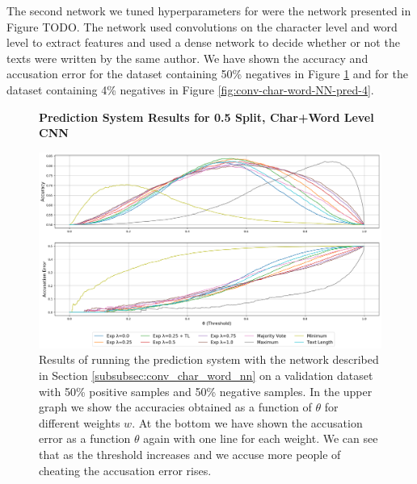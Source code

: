 The second network we tuned hyperparameters for were the network presented
in Figure TODO. The network used convolutions on the character level and
word level to extract features and used a dense network to decide whether or
not the texts were written by the same author. We have shown the accuracy
and accusation error for the dataset containing 50\% negatives in Figure
\ref{fig:conv-char-word-NN-pred-50} and for the dataset containing 4\%
negatives in Figure \ref{fig:conv-char-word-NN-pred-4}.

\begin{figure}
    \centering
    \textbf{Prediction System Results for 0.5 Split, Char+Word Level CNN}\par\medskip
    \includegraphics[scale=0.35]{./pictures/experiments/conv_char_word_nn/prediction_system_50.png}
    \caption{Results of running the prediction system with the network described
        in Section \ref{subsubsec:conv_char_word_nn} on a validation dataset
        with 50\% positive samples and 50\% negative samples. In the upper graph
        we show the accuracies obtained as a function of $\theta$ for different
        weights $w$. At the bottom we have shown the accusation error as a
        function $\theta$ again with one line for each weight. We can see that
        as the threshold increases and we accuse more people of cheating the
        accusation error rises.}
    \label{fig:conv-char-word-NN-pred-50}
\end{figure}

